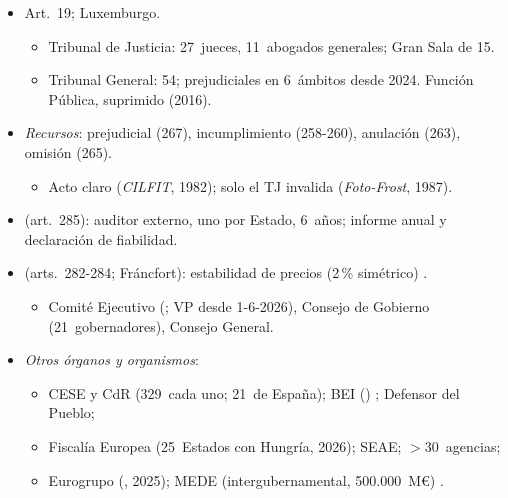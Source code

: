 \documentclass{article}
\begin{document}
\begin{columnas}
\begin{itemize}
\item Art.~19; Luxemburgo.
  \begin{itemize}
  \item Tribunal de Justicia: 27~jueces, 11~abogados generales; Gran Sala de 15.
  \item Tribunal General: 54; prejudiciales en 6~ámbitos desde 2024. Función Pública, suprimido (2016).
  \end{itemize}
\item \emph{Recursos}: prejudicial (267), incumplimiento (258-260), anulación (263), omisión (265).
  \begin{itemize}
  \item Acto claro (\emph{CILFIT}, 1982); solo el TJ invalida (\emph{Foto-Frost}, 1987).
  \end{itemize}
\end{itemize}

\begin{itemize}
\item {} (art.~285): auditor externo, uno por Estado, 6~años; informe anual y declaración de fiabilidad.
\item {} (arts.~282-284; Fráncfort): estabilidad de precios (2\,\% simétrico) .
  \begin{itemize}
  \item Comité Ejecutivo (;  VP desde 1-6-2026), Consejo de Gobierno (21~gobernadores), Consejo General.
  \end{itemize}
\item \emph{Otros órganos y organismos}:
  \begin{itemize}
  \item CESE y CdR (329~cada uno; 21~de España); BEI () ; Defensor del Pueblo;
  \item Fiscalía Europea (25~Estados con Hungría, 2026); SEAE; $>$30~agencias;
  \item Eurogrupo (, 2025); MEDE (intergubernamental, 500.000~M€) .
  \end{itemize}
\end{itemize}


\end{columnas}
\end{document}
